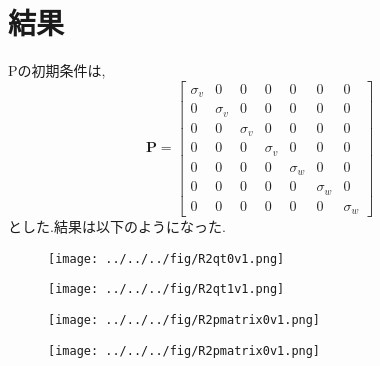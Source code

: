 \documentclass[class=article, crop=false, dvipdfmx, fleqn]{standalone}
\begin{document}
\section{結果}
Pの初期条件は,
\begin{equation}
  \bm{P} = \begin{bmatrix}
  \sigma_v & 0 & 0 & 0 & 0 & 0 & 0 \\
  0 & \sigma_v & 0 & 0 & 0 & 0 & 0 \\
  0 & 0 & \sigma_v & 0 & 0 & 0 & 0 \\
  0 & 0 & 0 & \sigma_v & 0 & 0 & 0 \\
  0 & 0 & 0 & 0 & \sigma_w & 0 & 0 \\
  0 & 0 & 0 & 0 & 0 & \sigma_w & 0 \\
  0 & 0 & 0 & 0 & 0 & 0 & \sigma_w
\end{bmatrix}
\end{equation}
とした.結果は以下のようになった.

\begin{figure}[H]
 \begin{minipage}{0.5\hsize}
  \begin{center}
   \texttt{[image: ../../../fig/R2qt0v1.png]}
  \end{center}
 \end{minipage}
 \begin{minipage}{0.5\hsize}
  \begin{center}
   \texttt{[image: ../../../fig/R2qt1v1.png]}
  \end{center}
 \end{minipage}
\end{figure}

\vspace{-1cm}

\begin{figure}[H]
 \begin{minipage}{0.5\hsize}
  \begin{center}
   \texttt{[image: ../../../fig/R2pmatrix0v1.png]}
  \end{center}
 \end{minipage}
 \begin{minipage}{0.5\hsize}
  \begin{center}
   \texttt{[image: ../../../fig/R2pmatrix0v1.png]}
  \end{center}
 \end{minipage}
\end{figure}
\end{document}

